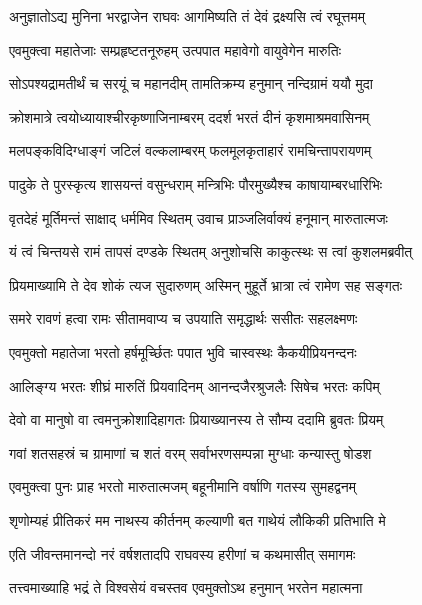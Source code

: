 \twolineshloka
{अनुज्ञातोऽद्य मुनिना भरद्वाजेन राघवः}
{आगमिष्यति तं देवं द्रक्ष्यसि त्वं रघूत्तमम्} %

\twolineshloka
{एवमुक्त्वा महातेजाः सम्प्रहृष्टतनूरुहम्}
{उत्पपात महावेगो वायुवेगेन मारुतिः} %

\twolineshloka
{सोऽपश्यद्रामतीर्थं च सरयूं च महानदीम्}
{तामतिक्रम्य हनुमान् नन्दिग्रामं ययौ मुदा} %

\twolineshloka
{क्रोशमात्रे त्वयोध्यायाश्चीरकृष्णाजिनाम्बरम्}
{ददर्श भरतं दीनं कृशमाश्रमवासिनम्} %

\twolineshloka
{मलपङ्कविदिग्धाङ्गं जटिलं वल्कलाम्बरम्}
{फलमूलकृताहारं रामचिन्तापरायणम्} %

\twolineshloka
{पादुके ते पुरस्कृत्य शासयन्तं वसुन्धराम्}
{मन्त्रिभिः पौरमुख्यैश्च काषायाम्बरधारिभिः} %

\twolineshloka
{वृतदेहं मूर्तिमन्तं साक्षाद् धर्ममिव स्थितम्}
{उवाच प्राञ्जलिर्वाक्यं हनूमान् मारुतात्मजः} %

\twolineshloka
{यं त्वं चिन्तयसे रामं तापसं दण्डके स्थितम्}
{अनुशोचसि काकुत्स्थः स त्वां कुशलमब्रवीत्} %

\twolineshloka
{प्रियमाख्यामि ते देव शोकं त्यज सुदारुणम्}
{अस्मिन् मुहूर्ते भ्रात्रा त्वं रामेण सह सङ्गतः} %

\twolineshloka
{समरे रावणं हत्वा रामः सीतामवाप्य च}
{उपयाति समृद्धार्थः ससीतः सहलक्ष्मणः} %

\twolineshloka
{एवमुक्तो महातेजा भरतो हर्षमूर्च्छितः}
{पपात भुवि चास्वस्थः कैकयीप्रियनन्दनः} %

\twolineshloka
{आलिङ्ग्य भरतः शीघ्रं मारुतिं प्रियवादिनम्}
{आनन्दजैरश्रुजलैः सिषेच भरतः कपिम्} %

\twolineshloka
{देवो वा मानुषो वा त्वमनुक्रोशादिहागतः}
{प्रियाख्यानस्य ते सौम्य ददामि ब्रुवतः प्रियम्} %

\twolineshloka
{गवां शतसहस्रं च ग्रामाणां च शतं वरम्}
{सर्वाभरणसम्पन्ना मुग्धाः कन्यास्तु षोडश} %

\twolineshloka
{एवमुक्त्वा पुनः प्राह भरतो मारुतात्मजम्}
{बहूनीमानि वर्षाणि गतस्य सुमहद्वनम्} %

\twolineshloka
{शृणोम्यहं प्रीतिकरं मम नाथस्य कीर्तनम्}
{कल्याणी बत गाथेयं लौकिकी प्रतिभाति मे} %

\twolineshloka
{एति जीवन्तमानन्दो नरं वर्षशतादपि}
{राघवस्य हरीणां च कथमासीत् समागमः} %

\twolineshloka
{तत्त्वमाख्याहि भद्रं ते विश्वसेयं वचस्तव}
{एवमुक्तोऽथ हनुमान् भरतेन महात्मना} %

